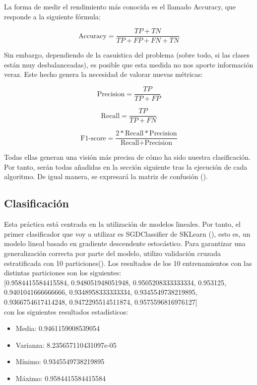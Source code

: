 La forma de medir el rendimiento más conocida es el llamado Accuracy, que responde a la siguiente fórmula:

$$\text{Accuracy} = \frac{TP+TN}{TP+FP+FN+TN}$$

Sin embargo, dependiendo de la casuística del problema (sobre todo, si las clases están muy desbalanceadas), es posible que esta medida no nos aporte información veraz. Este hecho genera la necesidad de valorar nuevas métricas:

$$\text{Precision} = \frac{TP}{TP+FP}$$

$$\text{Recall} = \frac{TP}{TP+FN}$$

$$\text{F1-score} = \frac{2*\text{Recall}*\text{Precision}}{\text{Recall}+\text{Precision}}$$

Todas ellas generan una visión más precisa de cómo ha sido nuestra clasificación. Por tanto, serán todas añadidas en la sección siguiente tras la ejecución de cada algoritmo. De igual manera, se expresará la matriz de confusión (\cite{cf}).

\subsection{Clasificación}

Esta práctica está centrada en la utilización de modelos lineales. Por tanto, el primer clasificador que voy a utilizar es SGDClassifier de SKLearn (\cite{SGD-C}), esto  es, un modelo lineal basado en gradiente descendente estocástico. Para garantizar una generalización correcta por parte del modelo, utilizo validación cruzada estratificada con 10 particiones(\cite{stk}). Los resultados de los 10 entrenamientos con las distintas particiones son los siguientes: \\

[0.9584415584415584, 0.948051948051948, 0.9505208333333334, 0.953125, 0.9401041666666666, 0.9348958333333334, 0.9345549738219895, 0.9366754617414248, 0.9472295514511874, 0.9575596816976127] \\


con los siguientes resultados estadísticos:

\begin{itemize}
	\item Media: 0.9461159008539054
	\item Varianza: 8.235657110431097e-05
	\item Mínimo: 0.9345549738219895
	\item Máximo: 0.9584415584415584
\end{itemize}

